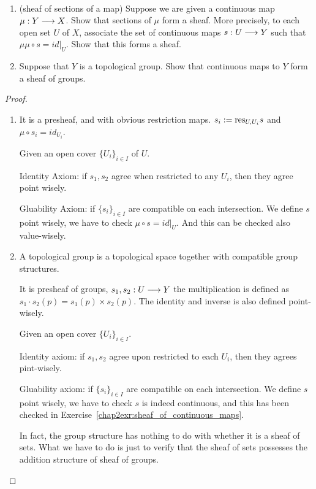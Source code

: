 \documentclass[11pt]{book} %
\begin{document}
\begin{exr}\ 
\begin{enumerate}[label=(\alph*)]
\item 
(sheaf of sections of a map) Suppose we are given a continuous map $\mu : Y \longrightarrow X$. Show that sections of $\mu$ form a sheaf. More precisely, to each open set $U$ of $X$, associate the set of continuous maps $s: U \longrightarrow  Y$ such that $μ\mu\circ s   = id|_U$. Show that this forms a sheaf. 
\item Suppose that $Y$ is a topological group. Show that continuous maps to $Y$ form a sheaf of groups.
\end{enumerate}
\end{exr}
\begin{proof}\ 
\begin{enumerate}[label=(\alph*)]
\item It is a presheaf, and with obvious restriction maps. $s_i:=\text{res}_{U,U_i}s$ and $\mu\circ s_i=id_{U_i}$. 

Given an open cover $\{U_i\}_{i\in I}$ of $U$.

Identity Axiom:  if $s_1,s_2$ agree when restricted to any $U_i$, then they agree point wisely.

Gluability Axiom: if $\{s_i\}_{i\in I}$  are compatible on each intersection. We define $s$ point wisely, we have to check $\mu\circ s=id|_U$. And this can be checked also value-wisely.
\item A topological group is a topological space together with  compatible group structures.

It is presheaf of groups, $s_1,s_2:U\longrightarrow Y$ the multiplication is defined as $s_1 \cdot s_2(p)=s_1(p)\times s_2(p)$. The identity and inverse is also defined point-wisely. 

Given an open cover $\{U_i\}_{i\in I}$.

Identity axiom: if $s_1,s_2$ agree upon restricted to each $U_i$, then they agrees pint-wisely.

Gluability axiom: if $\{s_i\}_{i\in I}$  are compatible on each intersection. We define $s$ point wisely, we have to check $s$ is indeed continuous, and this has been checked in Exercise~\ref{chap2exr:sheaf_of_continuous_maps}.

 In fact, the group structure has nothing to do with whether it is a sheaf of sets.
 What we have to do is just to verify that the sheaf of sets possesses the addition structure of sheaf of groups.
\end{enumerate}
\end{proof}
\end{document}
